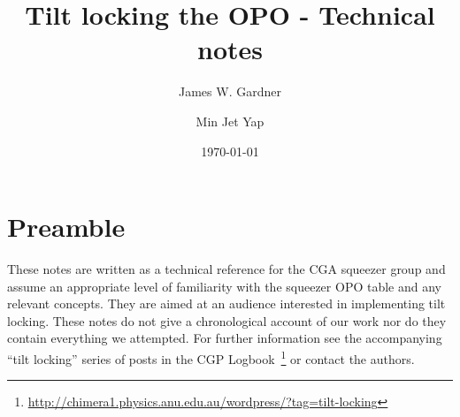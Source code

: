 \documentclass[aps,pra,superscriptaddress,reprint,nofootinbib]{revtex4-1}
\begin{document}
\title{Tilt locking the OPO - Technical notes}

\author{James W. Gardner}

\author{Min Jet Yap}



\date{\today}



\maketitle

\tableofcontents

\section{Preamble}
\label{sec:preamble}

These notes are written as a technical reference for the CGA squeezer group and assume an appropriate level of familiarity with the squeezer OPO table and any relevant concepts. They are aimed at an audience interested in implementing tilt locking.
These notes do not give a chronological account of our work nor do they contain everything we attempted. For further information see the accompanying ``tilt locking'' series of posts in the CGP Logbook~\footnote{\url{http://chimera1.physics.anu.edu.au/wordpress/?tag=tilt-locking}} or contact the authors.
\end{document}
